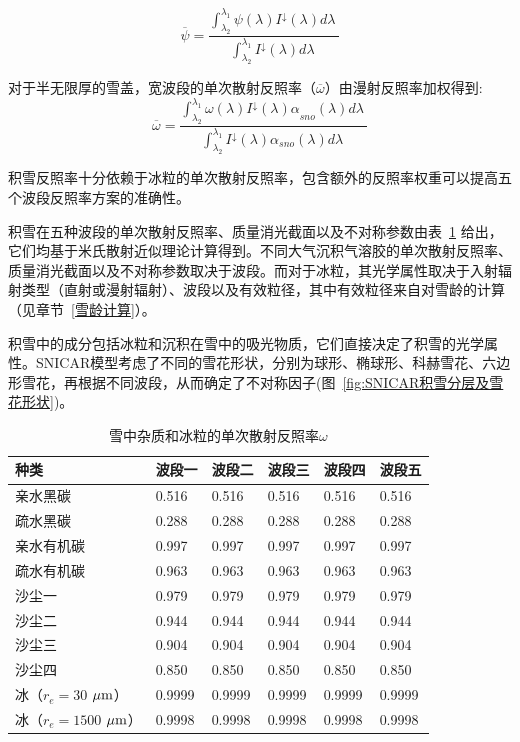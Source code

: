 \begin{equation}
\overline{\psi} = \frac{\int_{\lambda_{2}}^{\lambda_{1}}{\psi(\lambda)I^{\downarrow}(\lambda)d\lambda\ }}{\int_{\lambda_{2}}^{\lambda_{1}}{I^{\downarrow}(\lambda)d\lambda\ }}
\end{equation}

对于半无限厚的雪盖，宽波段的单次散射反照率（\(\overline{\omega}\)）由漫射反照率加权得到:
\begin{equation}
\overline{\omega} = \frac{\int_{\lambda_{2}}^{\lambda_{1}}{\omega(\lambda){I^{\downarrow}(\lambda)\alpha}_{sno}(\lambda)d\lambda\ }}{\int_{\lambda_{2}}^{\lambda_{1}}{I^{\downarrow}(\lambda)\alpha_{sno}(\lambda)d\lambda\ }}
\end{equation}

积雪反照率十分依赖于冰粒的单次散射反照率，包含额外的反照率权重可以提高五个波段反照率方案的准确性\citep{flanner2007PresentdayClimateForcing}。

积雪在五种波段的单次散射反照率、质量消光截面以及不对称参数由表~\ref{tab:积雪单次散射反照率} 给出，它们均基于米氏散射近似理论计算得到。不同大气沉积气溶胶的单次散射反照率、质量消光截面以及不对称参数取决于波段。而对于冰粒，其光学属性取决于入射辐射类型（直射或漫射辐射）、波段以及有效粒径，其中有效粒径来自对雪龄的计算（见章节~\ref{雪龄计算}）。

积雪中的成分包括冰粒和沉积在雪中的吸光物质，它们直接决定了积雪的光学属性。SNICAR模型考虑了不同的雪花形状，分别为球形、椭球形、科赫雪花、六边形雪花\citep{he2017ImpactSnowGrain}，再根据不同波段，从而确定了不对称因子(图~\ref{fig:SNICAR积雪分层及雪花形状})。

\begin{table}[htbp]
\centering
\caption{雪中杂质和冰粒的单次散射反照率$\omega$}
\label{tab:积雪单次散射反照率}
\begin{tabular}{llllll}
\toprule
种类 & 波段一 & 波段二 & 波段三 & 波段四 & 波段五 \\ \midrule
亲水黑碳 & 0.516 & 0.516 & 0.516 & 0.516 & 0.516 \\
疏水黑碳 & 0.288 & 0.288 & 0.288 & 0.288 & 0.288 \\
亲水有机碳 & 0.997 & 0.997 & 0.997 & 0.997 & 0.997 \\
疏水有机碳 & 0.963 & 0.963 & 0.963 & 0.963 & 0.963 \\
沙尘一 & 0.979 & 0.979 & 0.979 & 0.979 & 0.979 \\
沙尘二 & 0.944 & 0.944 & 0.944 & 0.944 & 0.944 \\
沙尘三 & 0.904 & 0.904 & 0.904 & 0.904 & 0.904 \\
沙尘四 & 0.850 & 0.850 & 0.850 & 0.850 & 0.850 \\
冰（$r_{e}=30$ $\mu\rm{m}$） & 0.9999 & 0.9999 & 0.9999 & 0.9999 &
0.9999 \\
冰（$r_{e}=1500$ $\mu\rm{m}$） & 0.9998 & 0.9998 & 0.9998 & 0.9998 &
0.9998 \\ \bottomrule
\end{tabular}
\end{table}

